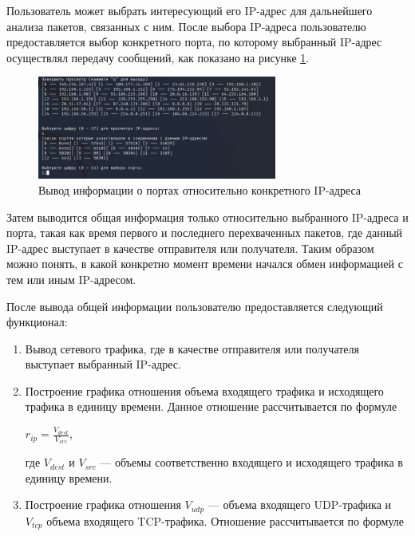 \documentclass[bachelor, och, coursework]{SCWorks}
\begin{document}
\begin{enumerate}
  Пользователь может выбрать интересующий его IP-адрес для дальнейшего анализа пакетов, связанных с ним. После выбора 
  IP-адреса пользователю предоставляется выбор конкретного порта, по которому выбранный IP-адрес осуществлял передачу сообщений, 
  как показано на рисунке \ref{cmd-geninf1}.
  
  \begin{figure}[H]
    \centering
    \includegraphics[width=0.7\textwidth]{photo/cmd-geninf1.jpg}
    \caption{Вывод информации о портах относительно конкретного IP-адреса}
    \label{cmd-geninf1}
  \end{figure}

  Затем выводится общая информация только относительно выбранного IP-адреса и порта, такая 
  как время первого и последнего перехваченных пакетов, где данный IP-адрес выступает в качестве отправителя или получателя.
  Таким образом можно понять, в какой конкретно момент времени начался обмен информацией с тем или иным IP-адресом.

  После вывода общей информации пользователю предоставляется следующий функционал:

  \begin{enumerate}
    \item Вывод сетевого трафика, где в качестве отправителя или получателя выступает выбранный IP-адрес.
    \item Построение графика отношения объема входящего трафика и исходящего трафика в единицу времени. Данное отношение 
    рассчитывается по формуле
    
    \begin{center}
      $r_{ip} = \frac{V_{dest}}{V_{src}}$,
    \end{center}

    где $V_{dest}$ и $V_{src}$ --- объемы соответственно входящего и исходящего трафика в единицу времени. 


    \item Построение графика отношения $V_{udp}$ --- объема входящего UDP-трафика и $V_{tcp}$ объема входящего TCP-трафика.
    Отношение рассчитывается по формуле


\end{enumerate}
\end{enumerate}
\end{document}
